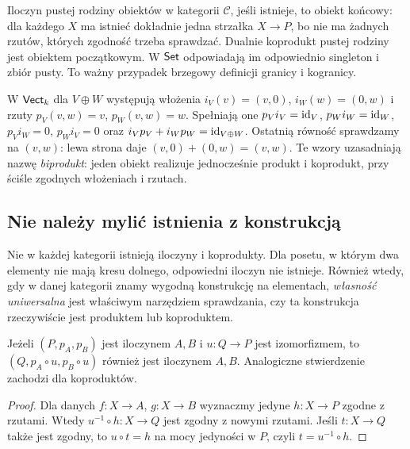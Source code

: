\begin{przyklad}
Iloczyn pustej rodziny obiektów w kategorii $\mathcal C$, jeśli istnieje, to obiekt końcowy: dla każdego $X$ ma istnieć dokładnie jedna strzałka $X\to P$, bo nie ma żadnych rzutów, których zgodność trzeba sprawdzać. Dualnie koprodukt pustej rodziny jest obiektem początkowym. W $\mathsf{Set}$ odpowiadają im odpowiednio singleton i zbiór pusty. To ważny przypadek brzegowy definicji granicy i kogranicy.
\end{przyklad}

\begin{przyklad}
W $\mathsf{Vect}_k$ dla $V\oplus W$ występują włożenia $i_V(v)=(v,0)$, $i_W(w)=(0,w)$ i rzuty $p_V(v,w)=v$, $p_W(v,w)=w$. Spełniają one $p_Vi_V=\mathrm{id}_V$, $p_Wi_W=\mathrm{id}_W$, $p_Vi_W=0$, $p_Wi_V=0$ oraz $i_Vp_V+i_Wp_W=\mathrm{id}_{V\oplus W}$. Ostatnią równość sprawdzamy na $(v,w)$: lewa strona daje $(v,0)+(0,w)=(v,w)$. Te wzory uzasadniają nazwę \emph{biprodukt}: jeden obiekt realizuje jednocześnie produkt i koprodukt, przy ściśle zgodnych włożeniach i rzutach.
\end{przyklad}


\subsection{Nie należy mylić istnienia z konstrukcją}

\begin{uwaga}
Nie w każdej kategorii istnieją iloczyny i koprodukty. Dla posetu, w którym dwa elementy nie mają kresu dolnego, odpowiedni iloczyn nie istnieje. Również wtedy, gdy w danej kategorii znamy wygodną konstrukcję na elementach, \emph{własność uniwersalna} jest właściwym narzędziem sprawdzania, czy ta konstrukcja rzeczywiście jest produktem lub koproduktem.
\end{uwaga}

\begin{stwierdzenie}
Jeżeli $(P,p_A,p_B)$ jest iloczynem $A,B$ i $u:Q\to P$ jest izomorfizmem, to $(Q,p_A\circ u,p_B\circ u)$ również jest iloczynem $A,B$. Analogiczne stwierdzenie zachodzi dla koproduktów.
\end{stwierdzenie}
\begin{proof}
Dla danych $f:X\to A$, $g:X\to B$ wyznaczmy jedyne $h:X\to P$ zgodne z rzutami. Wtedy $u^{-1}\circ h:X\to Q$ jest zgodny z nowymi rzutami. Jeśli $t:X\to Q$ także jest zgodny, to $u\circ t=h$ na mocy jedyności w $P$, czyli $t=u^{-1}\circ h$.
\end{proof}

